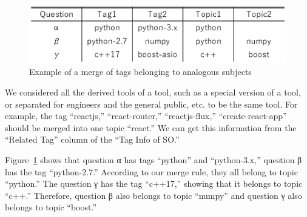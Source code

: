 \documentclass[conference]{IEEEtran}
\begin{document}
\begin{figure}[t]
 \centering
 \includegraphics[width=1.0\hsize]{img/ff2.eps}  
 \caption{Example of a merge of tags belonging to analogous subjects} 
 \label{fig:example2} 
\end{figure}

We considered all the derived tools of a tool, such as a special version of a tool, or separated for engineers and the general public, etc. to be the same tool. For example, the tag ``reactjs,'' ``react-router,'' ``reactjs-flux,'' ``create-react-app'' should be merged into one topic ``react.'' We can get this information from the “Related Tag” column of the ``Tag Info of SO.''

Figure~\ref{fig:example2} shows that question α has tags ``python'' and ``python-3.x,'' question β has the tag ``python-2.7.'' According to our merge rule, they all belong to topic ``python.'' The question γ has the tag ``c++17,'' showing that it belongs to topic ``c++.'' Therefore, question β also belongs to topic ``numpy'' and question γ also belongs to topic ``boost.''
\end{document}
